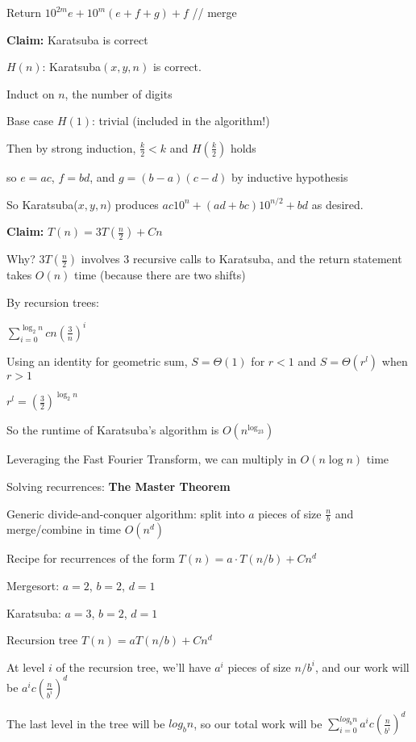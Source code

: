 \documentclass[12pt]{article}
\begin{document}
    Return $10^{2m}e + 10^m (e + f + g) + f$ // merge

\textbf{Claim:} Karatsuba is correct

$H(n)$: Karatsuba$(x, y, n)$ is correct.

Induct on $n$, the number of digits

Base case $H(1)$: trivial (included in the algorithm!)

Then by strong induction, $\frac{k}{2} < k$ and $H\left(\frac{k}{2}\right)$ holds

so $e = ac$, $f = bd$, and $g = (b - a)(c -d)$ by inductive hypothesis

So Karatsuba($x, y, n$) produces $ac10^n + (ad + bc)10^{n / 2} + bd$ as desired.

\textbf{Claim:} $T(n) = 3T\left(\frac{n}{2}\right) + Cn$

Why? $3T\left(\frac{n}{2}\right)$ involves 3 recursive calls to Karatsuba, and the return statement takes $O(n)$ time (because there are two shifts)

By recursion trees:

$\sum_{i = 0}^{\log_2n} cn\left(\frac{3}{n}\right)^i$

Using an identity for geometric sum, $S = \Theta(1)$ for $r < 1$ and $S = \Theta(r^l)$ when $r > 1$

$r^l = \left(\frac{3}{2}\right)^{\log_2n}$

So the runtime of Karatsuba's algorithm is $O(n^{\log_23})$

Leveraging the Fast Fourier Transform, we can multiply in $O(n \log n)$ time

Solving recurrences: \textbf{The Master Theorem}

Generic divide-and-conquer algorithm: split into $a$ pieces of size $\frac{n}{b}$ and merge/combine in time $O(n^d)$

Recipe for recurrences of the form $T(n) = a \cdot T(n / b) + Cn^d$

Mergesort: $a = 2$, $b = 2$, $d = 1$

Karatsuba: $a = 3$, $b = 2$, $d = 1$

Recursion tree $T(n) = aT(n / b) + Cn^d$

At level $i$ of the recursion tree, we'll have $a^i$ pieces of size $n / b^i$, and our work will be $a^i c\left(\frac{n}{b^i}\right)^d$

The last level in the tree will be $log_bn$, so our total work will be $\sum_{i = 0}^{log_bn} a^i c \left(\frac{n}{b^i}\right)^d$
\end{document}
